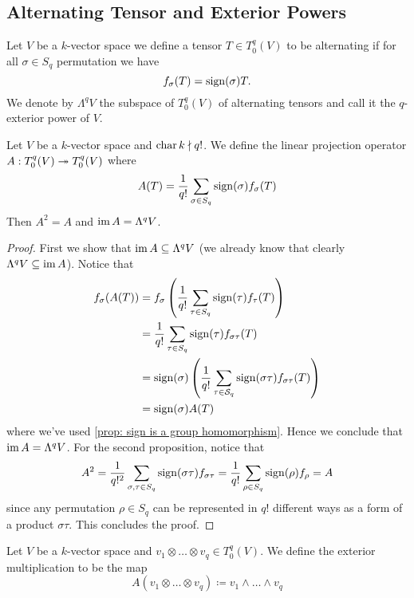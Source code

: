 \subsection{Alternating Tensor and Exterior Powers}

\begin{definition}
\label{def: alternating tensor}
Let \(V\) be a \(k\)-vector space we define a tensor \(T \in T_0^q(V)\) to be
alternating if for all \(\sigma \in S_q\) permutation we have
\[
  f_\sigma(T) = \operatorname{sign}(\sigma) T.
\]
We denote by \(\Lambda^q V\) the subspace of \(T_0^q(V)\) of alternating
tensors and call it the \(q\)-exterior power of \(V\).
\end{definition}

\begin{proposition}
\label{prop: alternating projection}
Let \(V\) be a \(k\)-vector space and \(\operatorname{char} k \nmid q!\). We
define the linear projection operator \(A: T_0^q(V) \twoheadrightarrow T_0^q(V)\) where
\[
  A(T) = \frac{1}{q!} \sum_{\sigma \in S_q} \operatorname{sign}(\sigma)
  f_\sigma(T)
\]
Then \(A^2 = A\) and \(\operatorname{im} A = \Lambda^q V\).
\end{proposition}

\begin{proof}
First we show that \(\operatorname{im} A \subseteq \Lambda^q V\) (we already know that
clearly \(\Lambda^q V \subseteq \operatorname{im} A\)). Notice that
\begin{align*}
  f_\sigma(A(T))
  &= f_\sigma \left( \frac 1 {q!} \sum_{\tau \in S_q}
  \operatorname{sign}(\tau) f_\tau(T) \right) \\
  &= \frac 1 {q!} \sum_{\tau \in S_q} \operatorname{sign}(\tau)
  f_{\sigma \tau}(T) \\
  &= \operatorname{sign}(\sigma) \left( \frac 1 {q!} \sum_{\tau \in \mathcal
  S_q} \operatorname{sign}(\sigma \tau) f_{\sigma \tau}(T) \right) \\
  &= \operatorname{sign}(\sigma) A(T)
\end{align*}
where we've used \cref{prop: sign is a group homomorphism}. Hence we conclude
that \(\operatorname{im} A = \Lambda^q V\). For the second proposition, notice that
\[
  A^2 = \frac 1 {q!^2} \sum_{\sigma, \tau \in S_q}
  \operatorname{sign}(\sigma \tau) f_{\sigma \tau}
  = \frac 1 {q!} \sum_{\rho \in S_q} \operatorname{sign}(\rho)
  f_\rho = A
\]
since any permutation \(\rho \in S_q\) can be represented in \(q!\)
different ways as a form of a product \(\sigma \tau\). This concludes the
proof.
\end{proof}

\begin{definition}
\label{def: exterior multiplication}
Let \(V\) be a \(k\)-vector space and \(v_1 \otimes \dots \otimes v_q \in
T_0^q(V)\). We define the exterior multiplication to be the map
\[
  A(v_1 \otimes \dots \otimes v_q) \coloneqq v_1 \wedge \dots \wedge v_q
\]
\end{definition}

